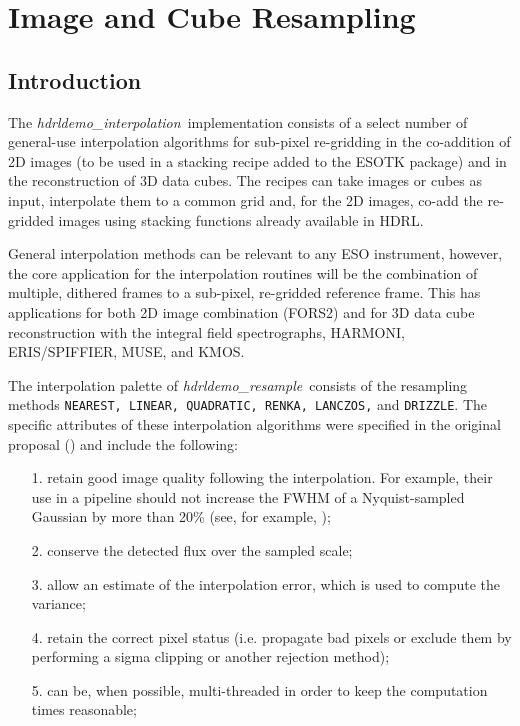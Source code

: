 

\def\sex{{\em SExtractor}}
\def\hdrlresample{{\em hdrldemo\_resample}}
\def\hdrlint{{\em hdrldemo\_interpolation}}





\section{Image and Cube Resampling}
\label{chap:assessing:resampling}

\subsection{Introduction}
\label{sect:intro}

The \hdrlint\  implementation consists of a select number of general-use interpolation algorithms for sub-pixel re-gridding in the co-addition of 2D images 
(to be used in a stacking recipe added to the ESOTK package) and in the reconstruction of 3D data cubes. 
The recipes can take images or cubes as input, interpolate them to a common grid and, for the 2D images, co-add the re-gridded images using 
stacking functions already available in HDRL.

General interpolation methods can be relevant to any ESO instrument, however, the core application for the interpolation routines will be the combination 
of multiple, dithered frames to a sub-pixel, re-gridded reference frame. This has applications for both 2D image combination (FORS2) 
and for 3D data cube reconstruction with the integral field spectrographs, HARMONI, ERIS/SPIFFIER, MUSE, and KMOS.

The interpolation palette of \hdrlresample\ consists of the resampling methods {\tt  NEAREST, LINEAR, QUADRATIC, RENKA, LANCZOS,}
and {\tt DRIZZLE}.   The specific attributes of these interpolation algorithms were specified in the original proposal (\cite{Neeser2019}) and include the following:
\begin{itemize}
\item[1.] retain good image quality following the interpolation. For example, their use in a pipeline should not increase the FWHM of a 
Nyquist-sampled Gaussian by more than 20\% (see, for example, \cite{harmoni});
\item[2.] conserve the detected flux over the sampled scale;
\item[3.] allow an estimate of the interpolation error, which is used to compute the variance;
\item[4.] retain the correct pixel status (i.e. propagate bad pixels or exclude them by performing a sigma clipping or another rejection method);
\item[5.] can be, when possible, multi-threaded in order to keep the computation times reasonable;
\end{itemize}

